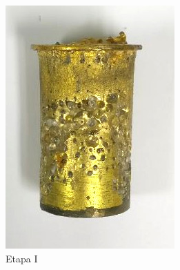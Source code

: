 \documentclass[a4paper,12pt,fleqn,twoside,openany]{book}
\begin{document}
\begin{figure}
 \centering
    \begin{subfigure}{0.30\textwidth}
        \includegraphics[width=\textwidth]{Img/Procedimiento/proceso1.jpg}
        \caption{Etapa I}
        \label{fig:proceso1}
    \end{subfigure}
    \begin{subfigure}{0.35\textwidth}

\end{subfigure}
\end{figure}
\end{document}
